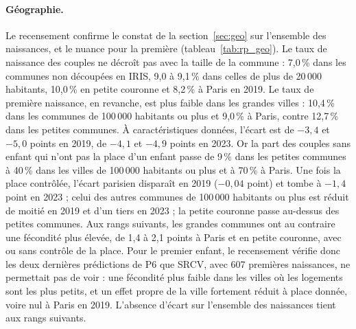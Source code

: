 \documentclass[11pt,a4paper]{article}
\theoremstyle{plain}
\theoremstyle{definition}
\theoremstyle{remark}
\begin{document}
\paragraph{Géographie.} Le recensement confirme le constat de la section~\ref{sec:geo} sur l'ensemble des naissances, et le nuance pour la première (tableau~\ref{tab:rp_geo}). Le taux de naissance des couples ne décroît pas avec la taille de la commune : 7,0\,\% dans les communes non découpées en IRIS, 9,0 à 9,1\,\% dans celles de plus de 20\,000 habitants, 10,0\,\% en petite couronne et 8,2\,\% à Paris en 2019. Le taux de première naissance, en revanche, est plus faible dans les grandes villes : 10,4\,\% dans les communes de 100\,000 habitants ou plus et 9,0\,\% à Paris, contre 12,7\,\% dans les petites communes. À caractéristiques données, l'écart est de $-3{,}4$ et $-5{,}0$ points en 2019, de $-4{,}1$ et $-4{,}9$ points en 2023. Or la part des couples sans enfant qui n'ont pas la place d'un enfant passe de 9\,\% dans les petites communes à 40\,\% dans les villes de 100\,000 habitants ou plus et à 70\,\% à Paris. Une fois la place contrôlée, l'écart parisien disparaît en 2019 ($-0{,}04$ point) et tombe à $-1{,}4$ point en 2023 ; celui des autres communes de 100\,000 habitants ou plus est réduit de moitié en 2019 et d'un tiers en 2023 ; la petite couronne passe au-dessus des petites communes. Aux rangs suivants, les grandes communes ont au contraire une fécondité plus élevée, de 1,4 à 2,1 points à Paris et en petite couronne, avec ou sans contrôle de la place. Pour le premier enfant, le recensement vérifie donc les deux dernières prédictions de P6 que SRCV, avec 607 premières naissances, ne permettait pas de voir : une fécondité plus faible dans les villes où les logements sont les plus petits, et un effet propre de la ville fortement réduit à place donnée, voire nul à Paris en 2019. L'absence d'écart sur l'ensemble des naissances tient aux rangs suivants.
\end{document}
